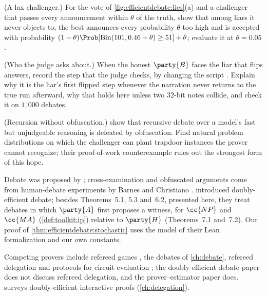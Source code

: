 \begin{refsection}
\begin{exercises}
\item \attack\hard (A lax challenger.) For the vote of \cref{fig:efficientdebate:lies}(a) and a challenger that passes every announcement within $\theta$ of the truth, show that among liars it never objects to, the best announces every probability $\theta$ too high and is accepted with probability $(1-\theta)\Prob[\mathrm{Bin}(101,0.46+\theta)\ge51]+\theta$; evaluate it at $\theta=0.05$. \label{ex:efficientdebate:lax}

\item \simulation (Who the judge asks about.) When the honest $\party{B}$ faces the liar that flips answers, record the step that the judge checks, by changing the script . Explain why it is the liar's first flipped step whenever the narration never returns to the true run afterward, why that holds here unless two $32$-bit notes collide, and check it on $1{,}000$ debates.\label{ex:efficientdebate:simwhere}

\item \research (Recursion without obfuscation.) \Textcite{BrownCohenIrving2024} show that recursive debate over a model's fast but unjudgeable reasoning is defeated by obfuscation. Find natural problem distributions on which the challenger can plant trapdoor instances the prover cannot recognize; their proof-of-work counterexample rules out the strongest form of this hope.\label{ex:efficientdebate:trapdoor}

\end{exercises}

\notesandrefs
Debate was proposed by \textcite{IrvingEtAl2018}; cross-examination and obfuscated arguments come from human-debate experiments by Barnes and Christiano \parencite{BarnesChristiano2020,Barnes2020}. \Textcite{BrownCohenEtAl2024} introduced doubly-efficient debate; besides Theorems~5.1, 5.3 and~6.2, presented here, they treat debates in which $\party{A}$ first proposes a witness, for $\cc{NP}$ and $\cc{MA}$ (\cref{def:toolkit:ip}) relative to $\party{H}$ (Theorems~7.1 and~7.2). Our proof of \cref{thm:efficientdebate:stochastic} uses the model of their Lean formalization and our own constants.

Competing provers include refereed games \parencite{FeigeKilian1997}, the debates of \cref{ch:debate}, refereed delegation \parencite{CanettiRivaRothblum2011,CanettiRivaRothblum2013} and protocols for circuit evaluation \parencite{KolRaz2014}; the doubly-efficient debate paper does not discuss refereed delegation, and the prover--estimator paper does. \Textcite{Goldreich2018} surveys doubly-efficient interactive proofs (\cref{ch:delegation}).


\end{refsection}
